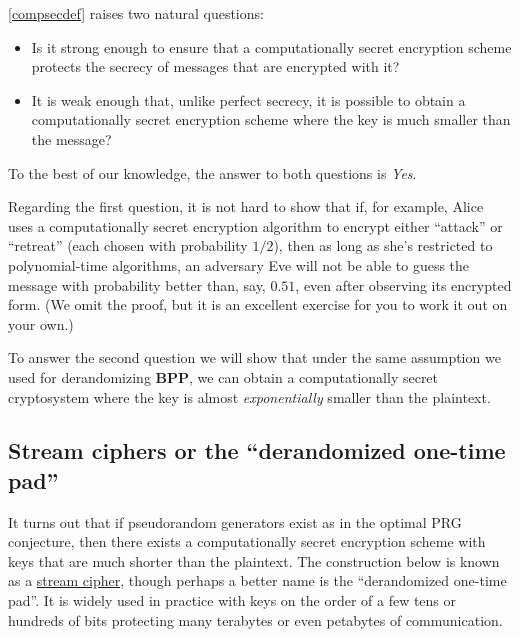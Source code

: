 \cref{compsecdef} raises two natural questions:

\begin{itemize}
\item
  Is it strong enough to ensure that a computationally secret encryption
  scheme protects the secrecy of messages that are encrypted with it?
\item
  It is weak enough that, unlike perfect secrecy, it is possible to
  obtain a computationally secret encryption scheme where the key is
  much smaller than the message?
\end{itemize}

To the best of our knowledge, the answer to both questions is
\emph{Yes}.

\hypertarget{computationcrypto}{}

Regarding the first question, it is not hard to show that if, for
example, Alice uses a computationally secret encryption algorithm to
encrypt either ``attack'' or ``retreat'' (each chosen with probability
\(1/2\)), then as long as she's restricted to polynomial-time
algorithms, an adversary Eve will not be able to guess the message with
probability better than, say, \(0.51\), even after observing its
encrypted form. (We omit the proof, but it is an excellent exercise for
you to work it out on your own.)

To answer the second question we will show that under the same
assumption we used for derandomizing \(\mathbf{BPP}\), we can obtain a
computationally secret cryptosystem where the key is almost
\emph{exponentially} smaller than the plaintext.

\subsection{Stream ciphers or the ``derandomized one-time
pad''}\label{Stream-ciphers-or-the-der}

It turns out that if pseudorandom generators exist as in the optimal PRG
conjecture, then there exists a computationally secret encryption scheme
with keys that are much shorter than the plaintext. The construction
below is known as a
\href{https://en.wikipedia.org/wiki/Stream_cipher}{stream cipher},
though perhaps a better name is the ``derandomized one-time pad''. It is
widely used in practice with keys on the order of a few tens or hundreds
of bits protecting many terabytes or even petabytes of communication.


